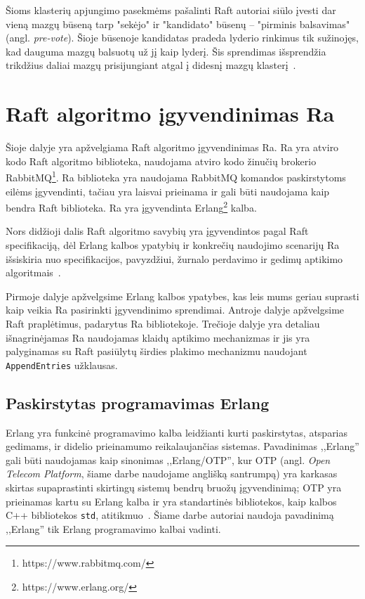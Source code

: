 \documentclass{VUMIFPSkursinis}
\begin{document}
Šioms klasterių apjungimo pasekmėms pašalinti Raft autoriai siūlo įvesti dar vieną mazgų būseną tarp "sekėjo" ir "kandidato" būsenų -- "pirminis balsavimas" (angl. \textit{pre-vote}). Šioje būsenoje kandidatas pradeda lyderio rinkimus tik sužinojęs, kad dauguma mazgų balsuotų už jį kaip lyderį. Šis sprendimas išsprendžia trikdžius daliai mazgų prisijungiant atgal į didesnį mazgų klasterį~\cite{ongaro_consensus}.

\section{Raft algoritmo įgyvendinimas Ra}

Šioje dalyje yra apžvelgiama Raft algoritmo įgyvendinimas Ra. Ra yra atviro kodo Raft algoritmo biblioteka, naudojama atviro kodo žinučių brokerio RabbitMQ\footnote{https://www.rabbitmq.com/}. Ra biblioteka yra naudojama RabbitMQ komandos paskirstytoms eilėms įgyvendinti, tačiau yra laisvai prieinama ir gali būti naudojama kaip bendra Raft biblioteka. Ra yra įgyvendinta Erlang\footnote{https://www.erlang.org/} kalba.

Nors didžioji dalis Raft algoritmo savybių yra įgyvendintos pagal Raft specifikaciją, dėl Erlang kalbos ypatybių ir konkrečių naudojimo scenarijų Ra išsiskiria nuo specifikacijos, pavyzdžiui, žurnalo perdavimo ir gedimų aptikimo algoritmais~\cite{rabbitmqra}.

Pirmoje dalyje apžvelgsime Erlang kalbos ypatybes, kas leis mums geriau suprasti kaip veikia Ra pasirinkti įgyvendinimo sprendimai. Antroje dalyje apžvelgsime Raft praplėtimus, padarytus Ra bibliotekoje. Trečioje dalyje yra detaliau išnagrinėjamas Ra naudojamas klaidų aptikimo mechanizmas ir jis yra palyginamas su Raft pasiūlytų širdies plakimo mechanizmu naudojant \texttt{AppendEntries} užklausas.

\subsection{Paskirstytas programavimas Erlang}

Erlang yra funkcinė programavimo kalba leidžianti kurti paskirstytas, atsparias gedimams, ir didelio prieinamumo reikalaujančias sistemas. Pavadinimas ,,Erlang'' gali būti naudojamas kaip sinonimas ,,Erlang/OTP'', kur OTP (angl. \textit{Open Telecom Platform}, šiame darbe naudojame anglišką santrumpą) yra karkasas skirtas supaprastinti skirtingų sistemų bendrų bruožų įgyvendinimą; OTP yra prieinamas kartu su Erlang kalba ir yra standartinės bibliotekos, kaip kalbos C++ bibliotekos \texttt{std}, atitikmuo~\cite{erlang_introduction}. Šiame darbe autoriai naudoja pavadinimą ,,Erlang'' tik Erlang programavimo kalbai vadinti.
\end{document}
